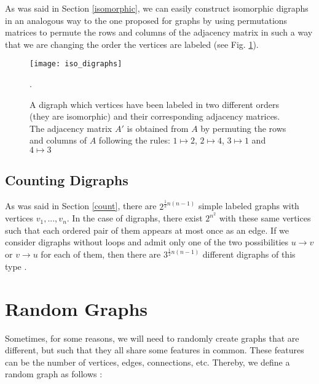 As was said in Section \ref{isomorphic}, we can easily construct isomorphic digraphs in an analogous way to the one proposed for graphs by using permutations matrices to permute the rows and columns of the adjacency matrix in such a way that we are changing the order the vertices are labeled (see Fig. \ref{fig:iso_digraphs}). %

\begin{figure}[h]
\centering
\texttt{[image: iso\_digraphs]}
\caption[Adjacency matrices for isomorphic digraphs.]{A digraph which vertices have been labeled in two different orders (they are isomorphic) and their corresponding adjacency matrices. The adjacency matrix $A'$ is obtained from $A$ by permuting the rows and columns of $A$ following the rules: $1 \mapsto 2$, $2 \mapsto 4$, $3 \mapsto 1$ and $4 \mapsto 3$}.
\label{fig:iso_digraphs}
\end{figure}

\subsection{Counting Digraphs}
As was said in Section \ref{count}, there are $ 2^{ \frac{1}{2} n(n-1) }$ simple labeled graphs with vertices $v_{1},...,v_{n}$. In the case of digraphs, there exist $2^{n^{2}}$ with these same vertices such that each ordered pair of them appears at most once as an edge. If we consider digraphs without loops and admit only one of the two possibilities $u \rightarrow v$ or $v \rightarrow u$ for each of them, then there are $ 3^{ \frac{1}{2} n(n-1) }$ different digraphs of this type \cite{douglas}.


\section{Random Graphs}
Sometimes, for some reasons, we will need to randomly create graphs that are different, but such that they all share some features in common. These features can be the number of vertices, edges, connections, etc. Thereby, we define a random graph as follows \cite{random_graphs}:

